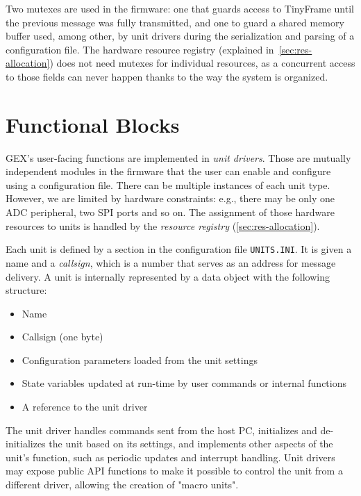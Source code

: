 Two mutexes are used in the firmware: one that guards access to TinyFrame until the previous message was fully transmitted, and one to guard a shared memory buffer used, among other, by unit drivers during the serialization and parsing of a configuration file. The hardware resource registry (explained in~\ref{sec:res-allocation}) does not need mutexes for individual resources, as a concurrent access to those fields can never happen thanks to the way the system is organized.

\section{Functional Blocks} \label{sec:units-function}

GEX's user-facing functions are implemented in \textit{unit drivers}. Those are mutually independent modules in the firmware that the user can enable and configure using a configuration file. There can be multiple instances of each unit type. However, we are limited by hardware constraints: e.g., there may be only one \gls{ADC} peripheral, two \gls{SPI} ports and so on. The assignment of those hardware resources to units is handled by the \textit{resource registry} (\ref{sec:res-allocation}).

Each unit is defined by a section in the configuration file \verb|UNITS.INI|. It is given a name and a \textit{callsign}, which is a number that serves as an address for message delivery. A unit is internally represented by a data object with the following structure:

\begin{itemize}
	\item Name
	\item Callsign (one byte)
	\item Configuration parameters loaded from the unit settings
	\item State variables updated at run-time by user commands or internal functions
	\item A reference to the unit driver
\end{itemize}

The unit driver handles commands sent from the host \gls{PC}, initializes and de-initializes the unit based on its settings, and implements other aspects of the unit's function, such as periodic updates and interrupt handling. Unit drivers may expose public \gls{API} functions to make it possible to control the unit from a different driver, allowing the creation of "macro units".


